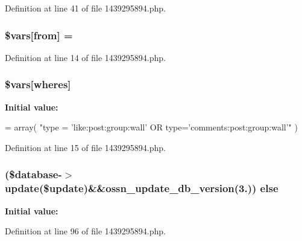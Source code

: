 Definition at line 41 of file 1439295894.\+php.

\subsubsection[{\texorpdfstring{\$vars}{$vars}}]{\setlength{\rightskip}{0pt plus 5cm}\$vars\mbox{[}\textquotesingle{}from\textquotesingle{}\mbox{]} = \textquotesingle{}}\hypertarget{1439295894_8php_a69d928c2a2126dc7d4207f81d8a4c3b5}{}\label{1439295894_8php_a69d928c2a2126dc7d4207f81d8a4c3b5}


Definition at line 14 of file 1439295894.\+php.

\subsubsection[{\texorpdfstring{\$vars}{$vars}}]{\setlength{\rightskip}{0pt plus 5cm}\$vars\mbox{[}\textquotesingle{}wheres\textquotesingle{}\mbox{]}}\hypertarget{1439295894_8php_ad23f13346da18e35b613d04e669dc292}{}\label{1439295894_8php_ad23f13346da18e35b613d04e669dc292}
{\bfseries Initial value\+:}
\begin{DoxyCode}
= array(
        \textcolor{stringliteral}{"type = 'like:post:group:wall' OR type='comments:post:group:wall'"}
)
\end{DoxyCode}


Definition at line 15 of file 1439295894.\+php.

\subsubsection[{\texorpdfstring{else}{else}}]{ (\${\bf database}-\/$>${\bf update}(\${\bf update})\&\&{\bf ossn\+\_\+update\+\_\+db\+\_\+version}(\textquotesingle{}3.\textquotesingle{})) else}\hypertarget{1439295894_8php_ae1f047549676f26dbd832af8901676ad}{}\label{1439295894_8php_ae1f047549676f26dbd832af8901676ad}
{\bfseries Initial value\+:}


Definition at line 96 of file 1439295894.\+php.

